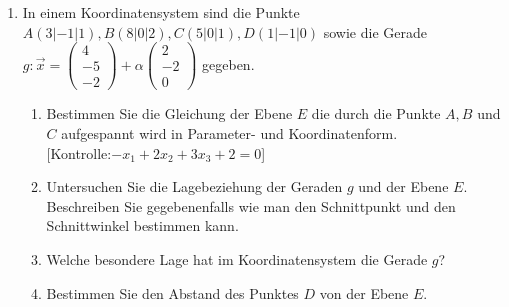 \documentclass[a4paper,12pt]{article}
\begin{document}
\begin{enumerate}
  \item In einem Koordinatensystem sind die Punkte $A(3|-1|1), B(8|0|2), C(5|0|1), D(1|-1|0)$ sowie die Gerade $g:\vec{x} = \begin{pmatrix} 4 \\ -5 \\ -2 \end{pmatrix} + \alpha \begin{pmatrix} 2 \\ -2 \\ 0 \end{pmatrix}$ gegeben.

  \begin{enumerate}[label={\alph*)}]
    \item Bestimmen Sie die Gleichung der Ebene $E$ die durch die Punkte $A, B$ und $C$ aufgespannt wird in Parameter- und Koordinatenform.\\
      {[Kontrolle:$-x_1+2x_2+3x_3+2=0$]}

  \item Untersuchen Sie die Lagebeziehung der Geraden $g$ und der Ebene $E$. Beschreiben Sie gegebenenfalls wie man den Schnittpunkt und den Schnittwinkel bestimmen kann.

  \item Welche besondere Lage hat im Koordinatensystem die Gerade $g$?

  \item Bestimmen Sie den Abstand des Punktes $D$ von der Ebene $E$.
  \end{enumerate}
\end{enumerate}
\end{document}
